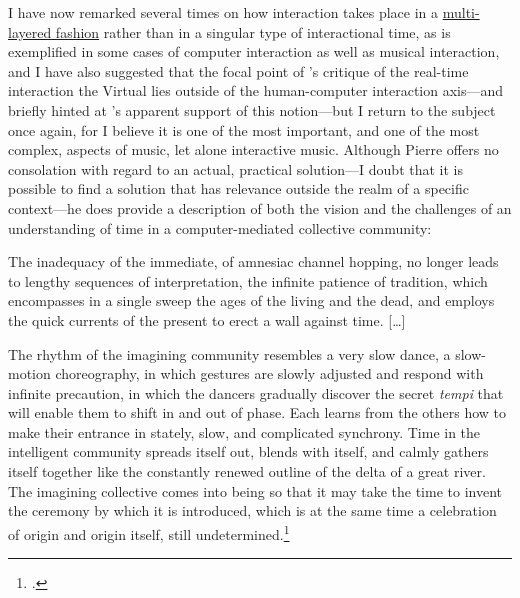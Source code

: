 I have now remarked several times on how interaction takes place in a \hyperlink{sec:human-comp-inter:par8}{multi-layered fashion} rather than in a singular type of interactional time, as is exemplified in some cases of computer interaction as well as musical interaction, and I have also suggested that the focal point of \citeauthor{baudrillard02}'s critique of the real-time interaction the Virtual lies outside of the human-computer interaction axis---and briefly hinted at \citeauthor{levy97}'s apparent support of this notion---but I return to the subject once again, for I believe it is one of the most important, and one of the most complex, aspects of music, let alone interactive music. Although Pierre \citeauthor{levy97} offers no consolation with regard to an actual, practical solution---I doubt that it is possible to find a solution that has relevance outside the realm of a specific context---he does provide a description of both the vision and the challenges of an understanding of time in a computer-mediated collective community:

\begin{squote}
The inadequacy of the immediate, of amnesiac channel hopping, no longer leads to lengthy sequences of interpretation, the infinite patience of tradition, which encompasses in a single sweep the ages of the living and the dead, and employs the quick currents of the present to erect a wall against time. [\ldots]

The rhythm of the imagining community resembles a very slow dance, a slow-motion choreography, in which gestures are slowly adjusted and respond with infinite precaution, in which the dancers gradually discover the secret \emph{tempi} that will enable them to shift in and out of phase. Each learns from the others how to make their entrance in stately, slow, and complicated synchrony. Time in the intelligent community spreads itself out, blends with itself, and calmly gathers itself together like the constantly renewed outline of the delta of a great river. The imagining collective comes into being so that it may take the time to invent the ceremony by which it is introduced, which is at the same time a celebration of origin and origin itself, still undetermined.\footcite[125]{levy97}
\end{squote}

